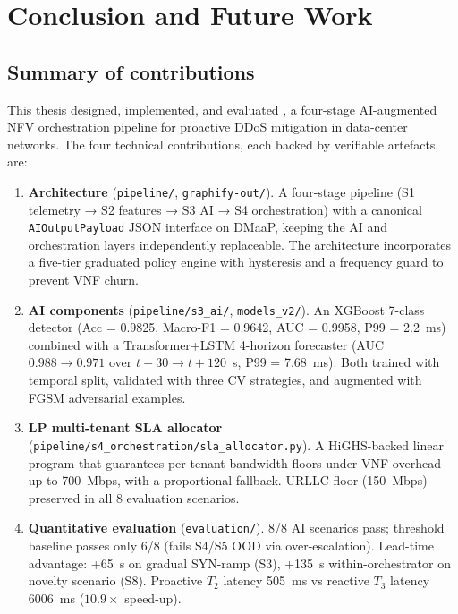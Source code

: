 \chapter{Conclusion and Future Work}
\label{ch:conclusion}

\section{Summary of contributions}

This thesis designed, implemented, and evaluated \padonap{}, a
four-stage AI-augmented NFV orchestration pipeline for proactive DDoS
mitigation in data-center networks. The four technical contributions,
each backed by verifiable artefacts, are:

\begin{enumerate}
  \item \textbf{Architecture} (\texttt{pipeline/}, \texttt{graphify-out/}).
        A four-stage pipeline (S1 telemetry → S2 features → S3 AI →
        S4 orchestration) with a canonical \texttt{AIOutputPayload} JSON
        interface on DMaaP, keeping the AI and orchestration layers
        independently replaceable. The architecture incorporates a
        five-tier graduated policy engine with hysteresis and a
        frequency guard to prevent VNF churn.

  \item \textbf{AI components} (\texttt{pipeline/s3\_ai/}, \texttt{models\_v2/}).
        An XGBoost 7-class detector (Acc = 0.9825, Macro-F1 = 0.9642,
        AUC = 0.9958, P99 = 2.2~ms) combined with a Transformer+LSTM
        4-horizon forecaster (AUC $0.988 \to 0.971$ over
        $t{+}30 \to t{+}120$~s, P99 = 7.68~ms). Both trained with
        temporal split, validated with three CV strategies, and
        augmented with FGSM adversarial examples.

  \item \textbf{LP multi-tenant SLA allocator}
        (\texttt{pipeline/s4\_orchestration/sla\_allocator.py}).
        A HiGHS-backed linear program that guarantees per-tenant
        bandwidth floors under VNF overhead up to 700~Mbps, with a
        proportional fallback. URLLC floor (150~Mbps) preserved in
        all 8 evaluation scenarios.

  \item \textbf{Quantitative evaluation} (\texttt{evaluation/}).
        8/8 AI scenarios pass; threshold baseline passes only 6/8
        (fails S4/S5 OOD via over-escalation). Lead-time advantage:
        +65~s on gradual SYN-ramp (S3), +135~s within-orchestrator
        on novelty scenario (S8). Proactive $T_2$ latency 505~ms
        vs reactive $T_3$ latency 6006~ms ($10.9\times$ speed-up).
\end{enumerate}

